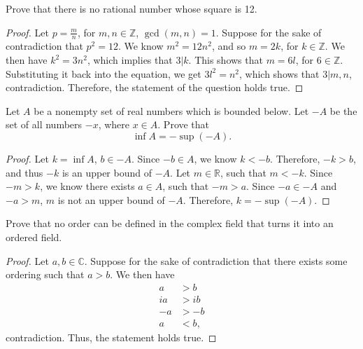 \documentclass[addpoints, 11pt]{exam}
\newcommand*{\Z}{\mathbb{Z}}
\newcommand*{\R}{\mathbb{R}}
\newcommand*{\C}{\mathbb{C}}
\newenvironment{question}[1]{\smallskip\noindent\color{crimson}{\bf Question #1.}}{}
\begin{document}
\begin{question}{E2}
    Prove that there is no rational number whose square is 12.
\end{question}

\begin{proof}
    Let $p = \frac{m}{n}$, for $m, n \in \Z$, $\gcd(m,n) = 1$. Suppose for the sake of contradiction that $p^2 = 12$. We know $m^2 = 12n^2$, and so $m = 2k$, for $k \in \Z$.  We then have $k^2 = 3n^2$, which implies that $3 | k$. This shows that $m = 6l$, for $6 \in \Z$. Substituting it back into the equation, we get $3l^2 = n^2$, which shows that $3 | m, n$, contradiction. Therefore, the statement of the question holds true.
\end{proof}

\newpage

\begin{question}{E5}
    Let $A$ be a nonempty set of real numbers which is bounded below. Let $-A$ be the set of all numbers $-x$, where $x \in A$. Prove that
    \[
        \inf A = -\sup(-A).
    \]
\end{question}

\begin{proof}
    Let $k = \inf A$, $b \in -A$. Since $-b \in A$, we know $k < -b$. Therefore, $-k > b$, and thus $-k$ is an upper bound of $-A$. Let $m \in \R$, such that $m < -k$. Since $-m > k$, we know there exists $a \in A$, such that $-m > a$. Since $-a \in -A$ and $-a > m$, $m$ is not an upper bound of $-A$. Therefore, $k = -\sup(-A)$.
\end{proof}

\newpage

\begin{question}{E8}
    Prove that no order can be defined in the complex field that turns it into an ordered field.
\end{question}

\begin{proof}
    Let $a, b \in \C$. Suppose for the sake of contradiction that there exists some ordering such that $a > b$. We then have 
    \begin{align*}
        a &> b \\
        ia &> ib \\
        -a &> -b \\
        a &< b,
    \end{align*}
    contradiction. Thus, the statement holds true. 
\end{proof}
\end{document}
